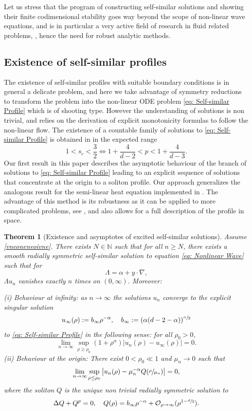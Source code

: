 \documentclass[10pt]{amsart}
\theoremstyle{plain}
\newtheorem{theorem}{Theorem}
\theoremstyle{definition}
\begin{document}
Let us stress that the program of constructing self-similar solutions and showing their finite codimensional stability goes way beyond the scope of non-linear wave equations, and is in particular a very active field of research in fluid related problems, \cite{MRRS}, hence the need for robust analytic methods.

\subsection{Existence of self-similar profiles}

The existence of self-similar profiles with suitable boundary conditions is in general a delicate problem, and here we take advantage of symmetry reductions to transform the problem into the non-linear ODE problem \eqref{eq: Self-similar Profile} which is of shooting type. However the understanding of solutions is non trivial, and relies on the derivation of explicit monotonicity formulas to follow the non-linear flow. The existence of a countable family of solutions to \eqref{eq: Self-similar Profile} is obtained in \cite{BMW,DD} in the expected range
\begin{equation}
\label{vneoneneoivne}
1<s_c<\frac{3}{2}\iff 1+\frac{4}{d-2}<p<1+\frac{4}{d-3}.
\end{equation}
Our first result in this paper describes the asymptotic behaviour of the branch of solutions to \eqref{eq: Self-similar Profile} leading to an explicit sequence of solutions that concentrate at the origin to a soliton profile. Our approach generalizes the analogous result for the semi-linear heat equation implemented in \cite{BB,CRS}. The advantage of this method is its robustness as it can be applied to more complicated problems, see \eg \cite{BMR}, and also allows for a full description of the profile in space.


\begin{theorem}[Existence and asymptotes of excited self-similar solutions]
\label{theo: Result 1}
Assume \eqref{vneoneneoivne}. There exists $N\in\mathbb N$ such that for all $n\ge N$, there exists a smooth radially symmetric self-similar solution to equation \eqref{eq: Nonlinear Wave} such that for
\[
\Lambda = \alpha+y\cdot \nabla,
\]
$\Lambda u_n$ vanishes exactly $n$ times on $(0,\infty)$. Moreover:

\emph{(i) Behaviour at infinity:} as $n\to \infty$ the solutions $u_n$ converge to the explicit singular solution
\[
u_\infty(\rho):=b_\infty\rho^{-\alpha}, \quad b_\infty:=(\alpha(d-2-\alpha))^{\sfrac{\alpha}{2}}
\]
to \eqref{eq: Self-similar Profile} in the following sense: for all $\rho_0>0$,
\[
\lim_{n\to \infty }\sup_{\rho\ge\rho_0}(1+\rho^\alpha)|u_n(\rho)-u_\infty(\rho)|=0.
\]
\emph{(ii) Behaviour at the origin:} There exist $0<\rho_0\ll1 $ and $\mu_n\to 0$ such that
\[
\lim_{n\to \infty }\sup_{\rho\le\rho_0}\big|u_n(\rho)-\mu_n^{-\alpha}Q(\sfrac{\rho}{\mu_n})\big|=0,
\]
where the soliton $Q$ is the unique non trivial radially symmetric solution to
\[
\Delta Q+Q^p=0,\quad Q(\rho)=b_\infty\rho^{-\alpha}+\mathcal O_{\rho\to\infty } (\rho^{1-\sfrac{d}{2}}).
\]
\end{theorem}
\end{document}
